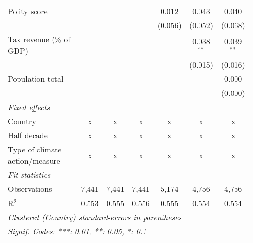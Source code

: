 \begin{tabular}{lcccccc}
   Polity score                                                           &         &                &                & 0.012          & 0.043          & 0.040\\   
                                                                          &         &                &                & (0.056)        & (0.052)        & (0.068)\\   
   Tax revenue (\% of GDP)                                                &         &                &                &                & 0.038$^{**}$   & 0.039$^{**}$\\   
                                                                          &         &                &                &                & (0.015)        & (0.016)\\   
   Population total                                                       &         &                &                &                &                & 0.000\\   
                                                                          &         &                &                &                &                & (0.000)\\   
   \emph{Fixed effects}\\
   Country                                                                & x       & x              & x              & x              & x              & x\\  
   Half decade                                                            & x       & x              & x              & x              & x              & x\\  
   Type of climate action/measure                                         & x       & x              & x              & x              & x              & x\\  
   \midrule \emph{Fit statistics}\\
   Observations                                                           & 7,441   & 7,441          & 7,441          & 5,174          & 4,756          & 4,756\\  
   R$^2$                                                                  & 0.553   & 0.555          & 0.556          & 0.555          & 0.554          & 0.554\\  
   \midrule
   \multicolumn{7}{l}{\emph{Clustered (Country) standard-errors in parentheses}}\\
   \multicolumn{7}{l}{\emph{Signif. Codes: ***: 0.01, **: 0.05, *: 0.1}}\\
\end{tabular}
\par\endgroup


